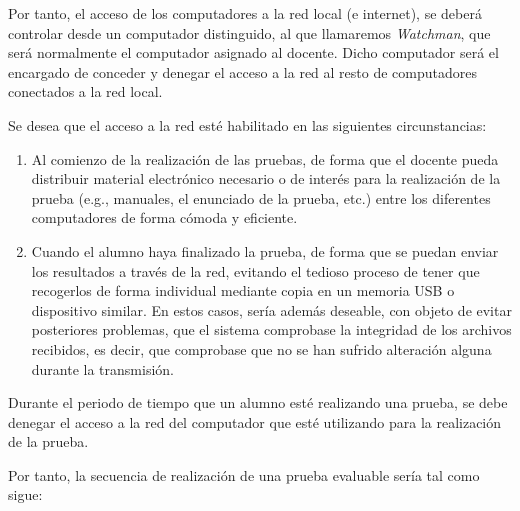 
Por tanto, el acceso de los computadores a la red local (e internet), se deberá controlar desde un computador distinguido, al que llamaremos \emph{Watchman},
que será normalmente el computador asignado al docente. Dicho computador será el encargado de conceder y denegar el acceso a la red al resto de computadores conectados a la red local.
\newline

Se desea que el acceso a la red esté habilitado en las siguientes circunstancias:
\begin{enumerate}
	\item Al comienzo de la realización de las pruebas, de forma que el docente pueda distribuir material electrónico necesario o de interés para la realización de la prueba (e.g., manuales, el enunciado de la prueba, etc.) entre los diferentes computadores de forma cómoda y eficiente.
	\item Cuando el alumno haya finalizado la prueba, de forma que se puedan enviar los resultados a través de la red, evitando el tedioso proceso de tener que recogerlos de forma individual mediante copia en un memoria USB o dispositivo similar. En estos casos, sería además deseable, con objeto de evitar posteriores problemas, que el sistema comprobase la integridad de los archivos recibidos, es decir, que comprobase que no se han sufrido alteración alguna durante la transmisión.
\end{enumerate}

Durante el periodo de tiempo que un alumno esté realizando una prueba, se debe denegar el acceso a la red del computador que esté utilizando para la realización de la prueba.
\newline


Por tanto, la secuencia de realización de una prueba evaluable sería tal como sigue:

